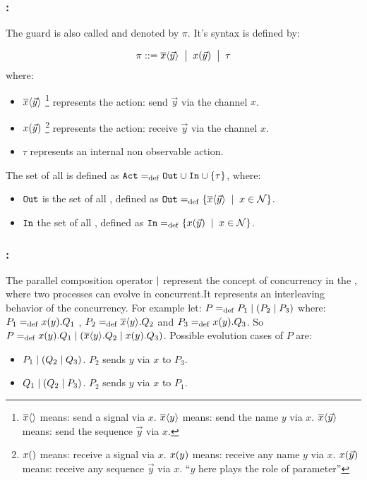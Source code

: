 \subsubsection{:} The guard is also called  and denoted by $\pi$. It's syntax is defined by:
\begin{definition}
\label{def_prefix_syntax}
\begin{align*}
 \pi ::= \overline{x}\langle\vec{y}\rangle \;\bigm|\; x(\vec{y}) \;\bigm|\; \tau
\end{align*}
where:
\begin{itemize}
\item $\overline{x}\langle\vec{y}\rangle$ \footnote{$\overline{x}\langle{}\rangle$ means: send a signal via $x$. $\overline{x}\langle{y}\rangle$ means: send the name $y$ via $x$.  $\overline{x}\langle{\vec{y}}\rangle$ means: send the sequence $\vec{y}$ via $x$.} represents the action: send $\vec{y}$ via the channel $x$.
\item $x(\vec{y})$ \footnote{$x({})$ means: receive a signal via $x$. $x({y})$ means: receive any name $y$ via $x$.  $x({\vec{y}})$ means: receive any sequence $\vec{y}$ via $x$. ``$y$ here plays the role of parameter''} represents the action: receive $\vec{y}$ via the channel $x$.
\item $\tau$ represents an internal non observable action.
\end{itemize}
\end{definition}
The set of all  is defined as $\actions\define\outA\cup\inA\cup\set{\tau}$, where:
\begin{itemize}
\item $\mathtt{Out}$ is the set of all , defined as $\outA\define\set[x\in\names]{\out{x}{\vec{y}}}$.
\item $\mathtt{In}$ the set of all , defined as $\inA\define\set[x\in\names]{\inp{x}{\vec{y}}}$.
\end{itemize}
\subsubsection{:}
The parallel composition operator $\mid$ represent the concept of concurrency in the \picalc{}, where two processes can evolve in concurrent.It represents an interleaving behavior of the concurrency.
For example let:  $P=_{\mathrm{def}}P_1 \mid (P_2 \mid P_3)$ where: $P_1=_{\mathrm{def}}x(y).Q_1$ , $P_2=_{\mathrm{def}}\overline{x}\langle y\rangle.Q_2$ and $P_3=_{\mathrm{def}}x(y).Q_3$. So $P=_{\mathrm{def}}x(y).Q_1 \mid (\overline{x}\langle y\rangle.Q_2 \mid x(y).Q_3)$.
Possible evolution cases of $P$ are:
\begin{itemize}
\item $P_1 \mid (Q_2 \mid Q_3)$. $P_2$ sends $y$ via $x$ to $P_3$.
\item $Q_1 \mid (Q_2 \mid P_3)$. $P_2$ sends $y$ via $x$ to $P_1$.
\end{itemize}

